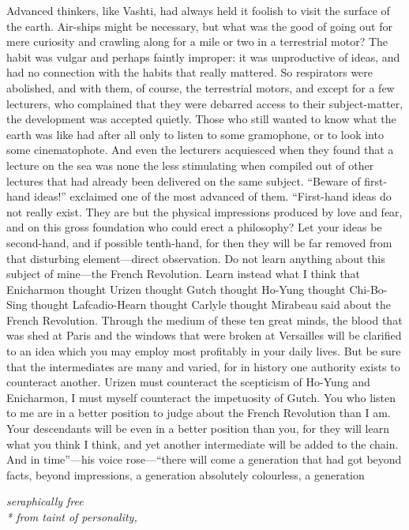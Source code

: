 Advanced thinkers, like Vashti, had always held it foolish to visit the surface of the earth. Air-ships might be necessary, but what was the good of going out for mere curiosity and crawling along for a mile or two in a terrestrial motor? The habit was vulgar and perhaps faintly improper: it was unproductive of ideas, and had no connection with the habits that really mattered. So respirators were abolished, and with them, of course, the terrestrial motors, and except for a few lecturers, who complained that they were debarred access to their subject-matter, the development was accepted quietly. Those who still wanted to know what the earth was like had after all only to listen to some gramophone, or to look into some cinematophote. And even the lecturers acquiesced when they found that a lecture on the sea was none the less stimulating when compiled out of other lectures that had already been delivered on the same subject. ``Beware of first- hand ideas!'' exclaimed one of the most advanced of them. ``First-hand ideas do not really exist. They are but the physical impressions produced by love and fear, and on this gross foundation who could erect a philosophy? Let your ideas be second-hand, and if possible tenth-hand, for then they will be far removed from that disturbing element---direct observation. Do not learn anything about this subject of mine---the French Revolution. Learn instead what I think that Enicharmon thought Urizen thought Gutch thought Ho-Yung thought Chi-Bo-Sing thought Lafcadio-Hearn thought Carlyle thought Mirabeau said about the French Revolution. Through the medium of these ten great minds, the blood that was shed at Paris and the windows that were broken at Versailles will be clarified to an idea which you may employ most profitably in your daily lives. But be sure that the intermediates are many and varied, for in history one authority exists to counteract another. Urizen must counteract the scepticism of Ho-Yung and Enicharmon, I must myself counteract the impetuosity of Gutch. You who listen to me are in a better position to judge about the French Revolution than I am. Your descendants will be even in a better position than you, for they will learn what you think I think, and yet another intermediate will be added to the chain. And in time''---his voice rose---``there will come a generation that had got beyond facts, beyond impressions, a generation absolutely colourless, a generation

\begin{center} \emph{seraphically free\\*
from taint of personality,} \end{center}


